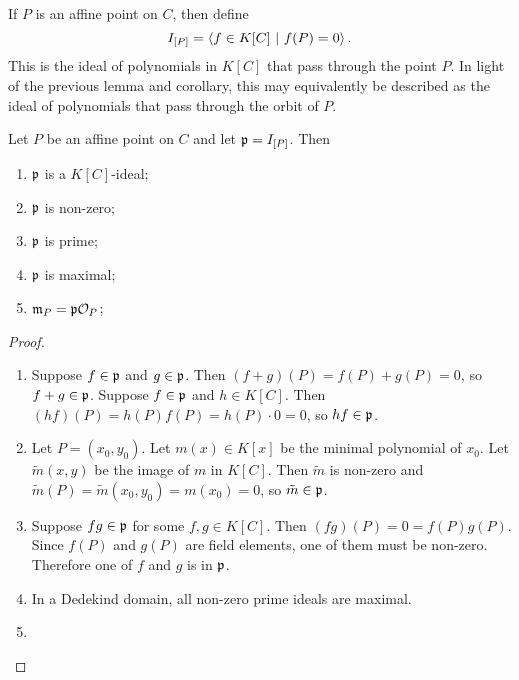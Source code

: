 If $P$ is an affine point on $C$, then define
\[ I_{[P]} = \pid{ f \in K[C] ~|~ f(P) = 0 }. \]
This is the ideal of polynomials in $K[C]$ that pass through the point $P$.
In light of the previous lemma and corollary,
this may equivalently be described as the ideal of polynomials that pass through the orbit of $P$.

\begin{proposition}
  Let $P$ be an affine point on $C$ and let $\frak p = I_{[P]}$. Then
  \begin{enumerate}[label=(\roman*)]
    \item $\frak p$ is a $K[C]$-ideal;
    \item $\frak p$ is non-zero;
    \item $\frak p$ is prime;
    \item $\frak p$ is maximal;
    \item $\frak m_P = \frak p \cal O_P$;
  \end{enumerate}
\end{proposition}
\begin{proof}
  \begin{enumerate}[label=(\roman*)]
    \item
    Suppose $f \in \frak p$ and $g \in \frak p$.
    Then $(f + g)(P) = f(P) + g(P) = 0$, so $f + g \in \frak p$.
    Suppose $f \in \frak p$ and $h \in K[C]$.
    Then $(hf)(P) = h(P)f(P) = h(P)\cdot 0 = 0$, so $hf \in \frak p$.
    
    \item
    Let $P = (x_0, y_0)$.
    Let $m(x) \in K[x]$ be the minimal polynomial of $x_0$.
    Let $\tilde m(x,y)$ be the image of $m$ in $K[C]$.
    Then $\tilde m$ is non-zero and $\tilde m(P) = \tilde m(x_0, y_0) = m(x_0) = 0$,
    so $\tilde m \in \frak p$.
    
    \item
    Suppose $fg \in \frak p$ for some $f, g \in K[C]$.
    Then $(fg)(P) = 0 = f(P)g(P)$.
    Since $f(P)$ and $g(P)$ are field elements, one of them must be non-zero.
    Therefore one of $f$ and $g$ is in $\frak p$.
    
    \item
    In a Dedekind domain, all non-zero prime ideals are maximal.
    
    \item
  \end{enumerate}
\end{proof}
